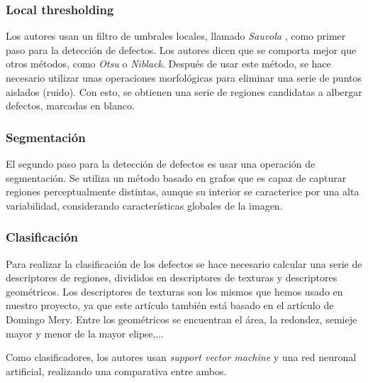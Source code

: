 \subsubsection{Local thresholding}
Los autores usan un filtro de umbrales locales, llamado \emph{Sauvola} \cite{Sauvola00adaptivedocument}, como primer paso para la detección de defectos. Los autores dicen que se comporta mejor que otros métodos, como \textit{Otsu} o \textit{Niblack}. Después de usar este método, se hace necesario utilizar unas operaciones morfológicas para eliminar una serie de puntos aislados (ruido). Con esto, se obtienen una serie de regiones candidatas a albergar defectos, marcadas en blanco.

\subsubsection{Segmentación}
El segundo paso para la detección de defectos es usar una operación de segmentación. Se utiliza un método basado en grafos que es capaz de capturar regiones perceptualmente distintas, aunque su interior se caracterice por una alta variabilidad, considerando características globales de la imagen.

\subsubsection{Clasificación}
Para realizar la clasificación de los defectos se hace necesario calcular una serie de descriptores de regiones, divididos en descriptores de texturas y descriptores geométricos. Los descriptores de texturas son los mismos que hemos usado en nuestro proyecto, ya que este artículo también está basado en el artículo de Domingo Mery. Entre los geométricos se encuentran el área, la redondez, semieje mayor y menor de la mayor elipse,...

Como clasificadores, los autores usan \emph{support vector machine} y una red neuronal artificial, realizando una comparativa entre ambos.